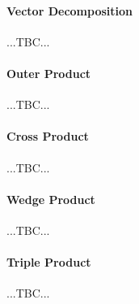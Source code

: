 \paragraph{Vector Decomposition} ...TBC...




\paragraph{Outer Product} ...TBC...

\paragraph{Cross Product} ...TBC...


\paragraph{Wedge Product} ...TBC...

\paragraph{Triple Product} ...TBC...









